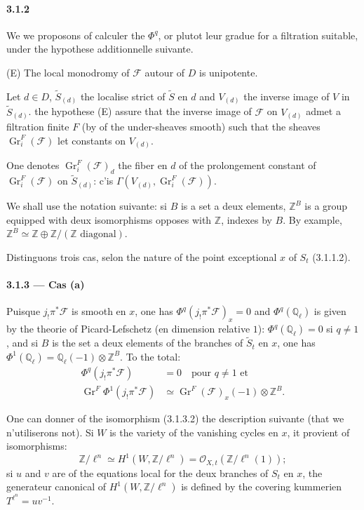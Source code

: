 \documentclass[12pt,a4paper]{article}
\theoremstyle{plain}
\theoremstyle{definition}
\theoremstyle{remark}
\DeclareMathOperator{\Gr}{Gr}
\newcommand{\QQ}{{\mathbb{Q}}}
\newcommand{\ZZ}{{\mathbb{Z}}}
\begin{document}
\paragraph{3.1.2}
We we proposons of calculer the $\Phi^q$, or plutot leur gradue for a filtration suitable, under the hypothese additionnelle suivante.

(E) The local monodromy of $\mathscr{F}$ autour of $D$ is unipotente.

Let $d \in D$, $\widetilde{S}_{(d)}$ the localise strict of $\widetilde{S}$ en $d$ and $V_{(d)}$ the inverse image of $V$ in $\widetilde{S}_{(d)}$. the hypothese (E) assure that the inverse image of $\mathscr{F}$ on $V_{(d)}$ admet a filtration finite $F$ (by of the under-sheaves smooth) such that the sheaves $\Gr_i^F(\mathscr{F})$ let constants on $V_{(d)}$.

One denotes $\Gr_i^F(\mathscr{F})_d$ the fiber en $d$ of the prolongement constant of $\Gr_i^F(\mathscr{F})$ on $\widetilde{S}_{(d)}$: c'is $\Gamma(V_{(d)}, \Gr_i^F(\mathscr{F}))$.


We shall use the notation suivante: si $B$ is a set a deux elements, $\ZZ^B$ is a group equipped with deux isomorphisms opposes with $\ZZ$, indexes by $B$. By example, $\ZZ^B \simeq \ZZ \oplus \ZZ / (\ZZ \text{ diagonal})$.

Distinguons trois cas, selon the nature of the point exceptional $x$ of $S_t$ (3.1.1.2).

\paragraph{3.1.3 --- Cas (a)}
Puisque $j_! \pi^*\mathscr{F}$ is smooth en $x$, one has $\Phi^q(j_! \pi^*\mathscr{F})_x = 0$ and $\Phi^q(\QQ_\ell)$ is given by the theorie of Picard-Lefschetz (en dimension relative $1$): $\Phi^q(\QQ_\ell) = 0$ si $q \neq 1$, and si $B$ is the set a deux elements of the branches of $\widetilde{S}_t$ en $x$, one has $\Phi^1(\QQ_\ell) = \QQ_\ell(-1) \otimes \ZZ^B$. To the total:
\begin{align}
\Phi^q(j_! \pi^*\mathscr{F}) &= 0 \quad \text{pour } q \neq 1 \text{ et} \label{eq:3.1.3.1} \\
\Gr^F \Phi^1(j_! \pi^*\mathscr{F}) &\simeq \Gr^F(\mathscr{F})_x(-1) \otimes \ZZ^B. \label{eq:3.1.3.2}
\end{align}

One can donner of the isomorphism (3.1.3.2) the description suivante (that we n'utiliserons not). Si $W$ is the variety of the vanishing cycles en $x$, it provient of isomorphisms:
\begin{equation}\label{eq:3.1.3.3}
\ZZ/\ell^n \simeq H^1(W, \ZZ/\ell^n) = \mathcal{O}_{X,t}(\ZZ/\ell^n(1));
\end{equation}
si $u$ and $v$ are of the equations local for the deux branches of $S_t$ en $x$, the generateur canonical of $H^1(W, \ZZ/\ell^n)$ is defined by the covering kummerien $T^{\ell^n} = uv^{-1}$.
\end{document}
